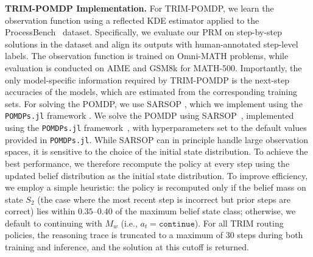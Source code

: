 \documentclass{article}
\theoremstyle{plain}
\theoremstyle{definition}
\theoremstyle{remark}
\newcommand{\cont}{\mathtt{continue}}
\begin{document}
\textbf{TRIM-POMDP Implementation.} For TRIM-POMDP, we learn the observation function using a reflected KDE estimator applied to the ProcessBench~\citep{processbench} dataset. Specifically, we evaluate our PRM on step-by-step solutions in the dataset and align its outputs with human-annotated step-level labels. The observation function is trained on Omni-MATH problems, while evaluation is conducted on AIME and GSM8k for MATH-500. Importantly, the only model-specific information required by TRIM-POMDP is the next-step accuracies of the models, which are estimated from the corresponding training sets. For solving the POMDP, we use SARSOP \citep{sarsop}, which we implement using the \texttt{POMDPs.jl} framework \citep{juliapomdps}. We solve the POMDP using SARSOP~\citep{sarsop}, implemented using the \texttt{POMDPs.jl} framework~\citep{juliapomdps}, with hyperparameters set to the default values provided in \texttt{POMDPs.jl}. While SARSOP can in principle handle large observation spaces, it is sensitive to the choice of the initial state distribution. To achieve the best performance, we therefore recompute the policy at every step using the updated belief distribution as the initial state distribution. To improve efficiency, we employ a simple heuristic: the policy is recomputed only if the belief mass on state $S_2$ (the case where the most recent step is incorrect but prior steps are correct) lies within $0.35$–$0.40$ of the maximum belief state class; otherwise, we default to continuing with $M_w$ (i.e., $a_t = \cont$). For all TRIM routing policies, the reasoning trace is truncated to a maximum of $30$ steps during both training and inference, and the solution at this cutoff is returned.

\end{document}

